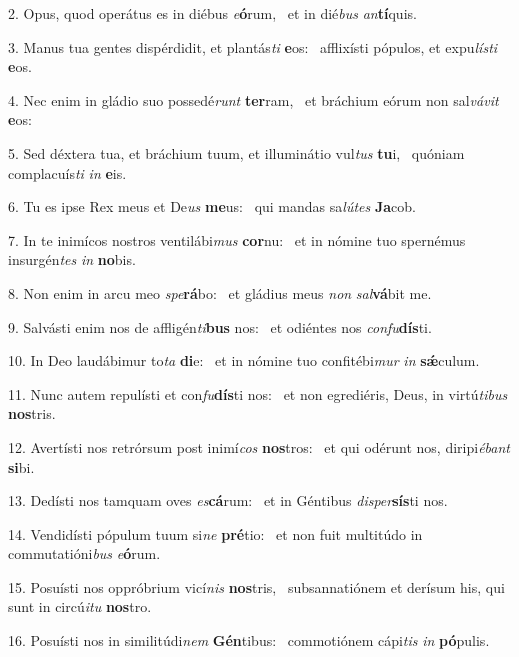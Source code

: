 2. Opus, quod operátus es in diébus \textit{e}\textbf{ó}rum, \ast\  et in dié\textit{bus} \textit{an}\textbf{tí}quis.\

3. Manus tua gentes dispérdidit, et plantás\textit{ti} \textbf{e}os: \ast\  afflixísti pópulos, et expu\textit{lís}\textit{ti} \textbf{e}os.\

4. Nec enim in gládio suo possedé\textit{runt} \textbf{ter}ram, \ast\  et bráchium eórum non sal\textit{vá}\textit{vit} \textbf{e}os:\

5. Sed déxtera tua, et bráchium tuum, et illuminátio vul\textit{tus} \textbf{tu}i, \ast\  quóniam complacuís\textit{ti} \textit{in} \textbf{e}is.\

6. Tu es ipse Rex meus et De\textit{us} \textbf{me}us: \ast\  qui mandas sa\textit{lú}\textit{tes} \textbf{Ja}cob.\

7. In te inimícos nostros ventilábi\textit{mus} \textbf{cor}nu: \ast\  et in nómine tuo spernémus insurgén\textit{tes} \textit{in} \textbf{no}bis.\

8. Non enim in arcu meo \textit{spe}\textbf{rá}bo: \ast\  et gládius meus \textit{non} \textit{sal}\textbf{vá}bit me.\

9. Salvásti enim nos de affligén\textit{ti}\textbf{bus} nos: \ast\  et odiéntes nos \textit{con}\textit{fu}\textbf{dís}ti.\

10. In Deo laudábimur to\textit{ta} \textbf{di}e: \ast\  et in nómine tuo confitébi\textit{mur} \textit{in} \textbf{sǽ}culum.\

11. Nunc autem repulísti et con\textit{fu}\textbf{dís}ti nos: \ast\  et non egrediéris, Deus, in virtú\textit{ti}\textit{bus} \textbf{nos}tris.\

12. Avertísti nos retrórsum post inimí\textit{cos} \textbf{nos}tros: \ast\  et qui odérunt nos, diripi\textit{é}\textit{bant} \textbf{si}bi.\

13. Dedísti nos tamquam oves \textit{es}\textbf{cá}rum: \ast\  et in Géntibus \textit{di}\textit{sper}\textbf{sís}ti nos.\

14. Vendidísti pópulum tuum si\textit{ne} \textbf{pré}tio: \ast\  et non fuit multitúdo in commutatióni\textit{bus} \textit{e}\textbf{ó}rum.\

15. Posuísti nos oppróbrium vicí\textit{nis} \textbf{nos}tris, \ast\  subsannatiónem et derísum his, qui sunt in circú\textit{i}\textit{tu} \textbf{nos}tro.\

16. Posuísti nos in similitúdi\textit{nem} \textbf{Gén}tibus: \ast\  commotiónem cápi\textit{tis} \textit{in} \textbf{pó}pulis.\

